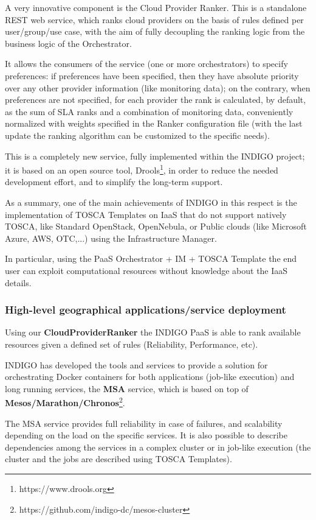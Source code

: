 \documentclass{article}
\begin{document}
A very innovative component is the Cloud Provider Ranker. This is a standalone REST web service, which ranks cloud providers on the basis of rules defined per user/group/use case, with the aim of fully decoupling the ranking logic from the business logic of the Orchestrator.

It allows the consumers of the service (one or more orchestrators) to specify preferences: if preferences have been specified, then they have absolute priority over any other provider information (like monitoring data); on the contrary, when preferences are not specified, for each provider the rank is calculated, by default, as the sum of SLA ranks and a combination of monitoring data, conveniently normalized with weights specified in the Ranker configuration file (with the last update the ranking algorithm can be customized to the specific needs).

This is a completely new service, fully implemented within the INDIGO project; it is based on an open source tool, Drools\footnote{https://www.drools.org}, in order to reduce the needed development effort, and to simplify the long-term support.

As a summary, one of the main achievements of INDIGO in this respect is the implementation of TOSCA Templates on IaaS that do not support natively TOSCA, like Standard OpenStack, OpenNebula, or Public clouds (like Microsoft Azure, AWS, OTC,...) using the Infrastructure Manager.

In particular, using the PaaS Orchestrator + IM + TOSCA Template the end user can exploit computational resources without knowledge about the IaaS details.


\subsubsection{High-level geographical applications/service deployment}

Using our {\bf CloudProviderRanker} the INDIGO PaaS is able to rank available resources given a defined set of rules (Reliability, Performance, etc). 

INDIGO has developed the tools and services to provide a solution for orchestrating Docker containers for both applications (job-like execution) and long running services, the {\bf MSA} service, which is based on top of {\bf Mesos/Marathon/Chronos}\footnote{https://github.com/indigo-dc/mesos-cluster}.

The MSA service provides full reliability  in case of failures, and scalability depending on the load on the specific services. It is also possible to describe  dependencies among the services in a complex cluster or in job-like execution  (the cluster and the jobs are described using TOSCA Templates).
\end{document}
